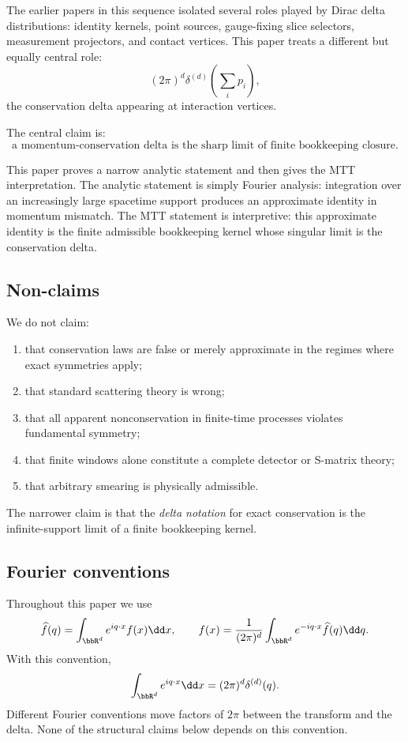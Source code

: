 \documentclass[11pt]{article}
\begin{document}
The earlier papers in this sequence isolated several roles played by Dirac delta distributions:
identity kernels, point sources, gauge-fixing slice selectors, measurement projectors, and contact vertices.  This paper treats a different but equally central role:
\[
(2\pi)^d\delta^{(d)}\!\left(\sum_i p_i\right),
\]
the conservation delta appearing at interaction vertices.

The central claim is:
\[
\boxed{\text{a momentum-conservation delta is the sharp limit of finite bookkeeping closure.}}
\]

This paper proves a narrow analytic statement and then gives the MTT interpretation.  The analytic statement is simply Fourier analysis: integration over an increasingly large spacetime support produces an approximate identity in momentum mismatch.  The MTT statement is interpretive: this approximate identity is the finite admissible bookkeeping kernel whose singular limit is the conservation delta.

\subsection{Non-claims}

We do not claim:
\begin{enumerate}
\item that conservation laws are false or merely approximate in the regimes where exact symmetries apply;
\item that standard scattering theory is wrong;
\item that all apparent nonconservation in finite-time processes violates fundamental symmetry;
\item that finite windows alone constitute a complete detector or S-matrix theory;
\item that arbitrary smearing is physically admissible.
\end{enumerate}

The narrower claim is that the \emph{delta notation} for exact conservation is the infinite-support limit of a finite bookkeeping kernel.


\subsection{Fourier conventions}

Throughout this paper we use
\[
\widehat f(q)=\int_{\bbR^d} e^{iq\cdot x}f(x)\dd x,
\qquad
f(x)=\frac{1}{(2\pi)^d}\int_{\bbR^d}e^{-iq\cdot x}\widehat f(q)\dd q .
\]
With this convention,
\[
\int_{\bbR^d}e^{iq\cdot x}\dd x=(2\pi)^d\delta^{(d)}(q).
\]
Different Fourier conventions move factors of \(2\pi\) between the transform and the delta.  None of the structural claims below depends on this convention.
\end{document}
